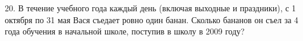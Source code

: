 20. В течение учебного года каждый день (включая выходные и праздники), с 1 октября по 31 мая Вася съедает ровно один банан. Сколько бананов он съел за 4 года обучения в начальной школе, поступив в школу в 2009 году?\\
